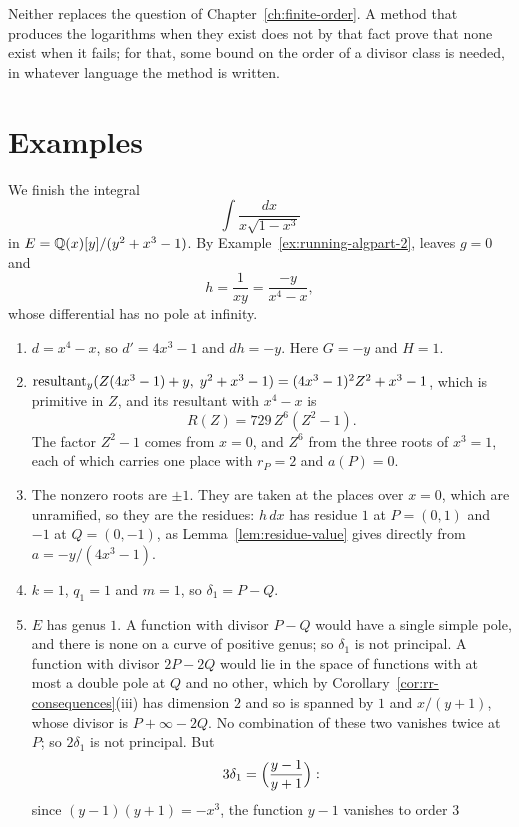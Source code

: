 Neither replaces the question of Chapter~\ref{ch:finite-order}. A method
that produces the logarithms when they exist does not by that fact prove
that none exist when it fails; for that, some bound on the order of a
divisor class is needed, in whatever language the method is written.

\section{Examples}\label{sec:log-examples}

\begin{example}\label{ex:running-log}
We finish the integral
\[
  \int \frac{dx}{x \sqrt{1 - x^3}}
\]
in $E = \mathbb{Q}(x)[y]/(y^2 + x^3 - 1)$. By Example~\ref{ex:running-algpart-2},
 leaves $g = 0$ and
\[
  h = \frac{1}{x y} = \frac{-y}{x^4 - x},
\]
whose differential has no pole at infinity.
\begin{enumerate}
\item $d = x^4 - x$, so $d' = 4x^3 - 1$ and $dh = -y$. Here $G = -y$ and $H =
  1$.
\item $\operatorname{resultant}_y(Z (4x^3 - 1) + y,\; y^2 + x^3 - 1) = (4x^3 - 1)^2 Z^2 +
  x^3 - 1$, which is primitive in $Z$, and its resultant with $x^4 - x$ is
  \[
    R(Z) = 729\, Z^6 (Z^2 - 1) .
  \]
  The factor $Z^2 - 1$ comes from $x = 0$, and $Z^6$ from the three roots of
  $x^3 = 1$, each of which carries one place with $r_P = 2$ and $a(P) = 0$.
\item The nonzero roots are $\pm 1$. They are taken at the places over $x =
  0$, which are unramified, so they are the residues: $h\,dx$ has residue
  $1$ at $P = (0, 1)$ and $-1$ at $Q = (0, -1)$, as
  Lemma~\ref{lem:residue-value} gives directly from $a = -y/(4x^3 - 1)$.
\item $k = 1$, $q_1 = 1$ and $m = 1$, so $\delta_1 = P - Q$.
\item $E$ has genus $1$. A function with divisor $P - Q$ would have a single
  simple pole, and there is none on a curve of positive genus; so $\delta_1$
  is not principal. A function with divisor $2P - 2Q$ would lie in the space
  of functions with at most a double pole at $Q$ and no other, which by
  Corollary~\ref{cor:rr-consequences}(iii) has dimension $2$ and so is spanned by $1$ and
  $x/(y + 1)$, whose divisor is $P + \infty - 2Q$. No combination of these
  two vanishes twice at $P$; so $2\delta_1$ is not principal. But
  \[
    3\delta_1 = \Bigl( \frac{y - 1}{y + 1} \Bigr) :
  \]
  since $(y - 1)(y + 1) = -x^3$, the function $y - 1$ vanishes to order $3$

\end{enumerate}
\end{example}

